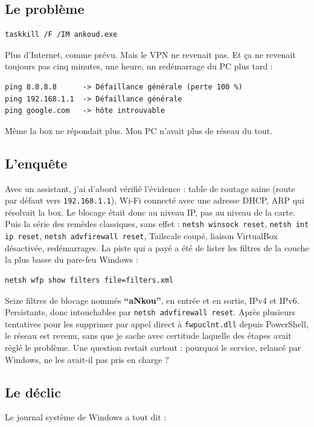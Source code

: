 \documentclass[10pt,twoside,openany]{article}
\begin{document}
\subsection*{Le problème}

\begin{lstlisting}
taskkill /F /IM ankoud.exe
\end{lstlisting}

Plus d'Internet, comme prévu. Mais le VPN ne revenait pas. Et ça ne revenait toujours pas cinq minutes, une heure, un redémarrage du PC plus tard :

\begin{lstlisting}
ping 8.8.8.8      -> Défaillance générale (perte 100 %)
ping 192.168.1.1  -> Défaillance générale
ping google.com   -> hôte introuvable
\end{lstlisting}

Même la box ne répondait plus. Mon PC n'avait plus de réseau du tout.

\subsection*{L'enquête}
Avec un assistant, j'ai d'abord vérifié l'évidence : table de routage saine (route par défaut vers \texttt{192.168.1.1}), Wi-Fi connecté avec une adresse DHCP, ARP qui résolvait la box. Le blocage était donc au niveau IP, pas au niveau de la carte. Puis la série des remèdes classiques, sans effet : \texttt{netsh winsock reset}, \texttt{netsh int ip reset}, \texttt{netsh advfirewall reset}, Tailscale coupé, liaison VirtualBox désactivée, redémarrages. La piste qui a payé a été de lister les filtres de la couche la plus basse du pare-feu Windows :

\begin{lstlisting}
netsh wfp show filters file=filters.xml
\end{lstlisting}

Seize filtres de blocage nommés \textbf{\enquote{aNkou}}, en entrée et en sortie, IPv4 et IPv6. Persistants, donc intouchables par \texttt{netsh advfirewall reset}. Après plusieurs tentatives pour les supprimer par appel direct à \texttt{fwpuclnt.dll} depuis PowerShell, le réseau est revenu, sans que je sache avec certitude laquelle des étapes avait réglé le problème. Une question restait surtout : pourquoi le service, relancé par Windows, ne les avait-il pas pris en charge ?

\subsection*{Le déclic}
Le journal système de Windows a tout dit :
\end{document}
